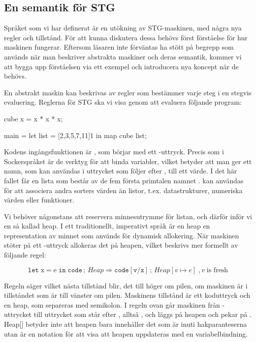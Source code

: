 \documentclass[../Core]{subfiles}
\begin{document}
\subsection{En semantik för STG}





Språket som vi har definerat är en utökning av STG-maskinen, med några
nya regler och tillstånd. För att kunna diskutera dessa behövs först
förståelse för hur maskinen fungerar. Eftersom läsaren inte förväntas
ha stött på begrepp som används när man beskriver abstrakta maskiner
och deras semantik, kommer vi att bygga upp förståelsen via ett exempel
och introducera nya koncept när de behövs. 

En abstrakt maskin kan beskrivas av regler som bestämmer varje steg i en stegvis evaluering. Reglerna
för STG ska vi visa genom att evaluera följande program:

\begin{codeEx}
cube x = x * x * x;

main = let list = [2,3,5,7,11]1
        in map cube list;
\end{codeEx}

Kodens ingångsfunktionen är , som börjar med ett -uttryck.
Precis som i Sockerspråket är de verktyg för att binda variabler, vilket betyder att man ger ett
namn, som kan användas i uttrycket som följer efter ,
till ett värde. I det här fallet får
en lista som består av de fem första primtalen namnet .
 kan användas för att associera andra sorters värden än listor,
t.ex. datastrukturer, numeriska värden eller funktioner.

Vi behöver någonstans att reservera minnesutrymme för listan, och därför
inför vi en så kallad heap. I ett traditionellt, imperativt språk är
en heap en representation av minnet som används för dynamisk allokering. När
maskinen stöter på ett -uttryck allokeras det på heapen, vilket
beskrivs mer formellt av följande regel:


\[
\mathtt{let\;\mathrm{x\mathtt{=}e}\; in\; code}\,;\, Heap\Rightarrow\mathtt{code[v/x]}\,;\, Heap[v\mapsto e] \;, v\; \textrm{is fresh}
\]

Regeln säger vilket nästa tillstånd blir, det till höger om pilen,
om maskinen är i tillståndet som är till vänster om pilen.
Maskinens tillstånd är ett koduttryck och en heap, som separeras med
semikolon. I regeln ovan går maskinen från -uttrycket till
uttrycket som står efter , alltså ,
och  läggs på heapen och pekar på .
Heap{[}{]} betyder inte att heapen bara innehåller det som är inuti
hakparanteserna utan är en notation för att visa att heapen
uppdateras med en variabelbindning.
\end{document}
